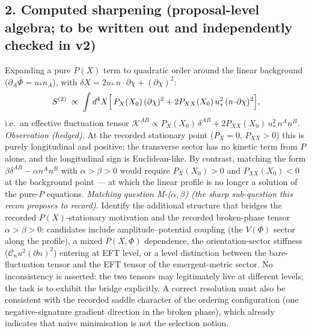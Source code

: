 \subsection*{2. Computed sharpening (proposal-level algebra;
to be written out and independently checked in v2)}
Expanding a pure $P(X)$ term to quadratic order around the linear
background ($\partial_A\bar\Phi=u_*n_A$), with
$\delta X=2u_*\,n\!\cdot\!\partial\chi+(\partial\chi)^2$:
\[
S^{(2)}\;\propto\;\int d^4X\Bigl[\,P_X(X_0)\,(\partial\chi)^2
+2P_{XX}(X_0)\,u_*^2\,(n\!\cdot\!\partial\chi)^2\Bigr],
\]
i.e.\ an effective fluctuation tensor
$\mathcal K^{AB}\propto P_X(X_0)\,\delta^{AB}
+2P_{XX}(X_0)\,u_*^2\,n^An^B$.
\emph{Observation (hedged).}
At the recorded stationary point ($P_X=0$, $P_{XX}>0$) this is
purely longitudinal and positive: the transverse sector has no
kinetic term from $P$ alone, and the longitudinal sign is
Euclidean-like.
By contrast, matching the form $\beta\delta^{AB}-\alpha n^An^B$
with $\alpha>\beta>0$ would require $P_X(X_0)>0$ and
$P_{XX}(X_0)<0$ at the background point --- at which the linear
profile is no longer a solution of the pure-$P$ equations.
\emph{Matching question M-($\alpha,\beta$) (the sharp sub-question
this recon proposes to record).}
Identify the additional structure that bridges the recorded
$P(X)$-stationary motivation and the recorded broken-phase tensor
$\alpha>\beta>0$: candidates include amplitude--potential coupling
(the $V(\Phi)$ sector along the profile), a mixed
$P(X,\Phi)$ dependence, the orientation-sector stiffness
($\mathcal C_n u^2(\partial n)^2$) entering at EFT level, or a
level distinction between the bare-fluctuation tensor and the
EFT tensor of the emergent-metric sector.
No inconsistency is asserted: the two tensors may legitimately
live at different levels; the task is to exhibit the bridge
explicitly.
A correct resolution must also be consistent with the recorded
saddle character of the ordering configuration (one
negative-signature gradient direction in the broken phase), which
already indicates that naive minimisation is not the selection
notion.

